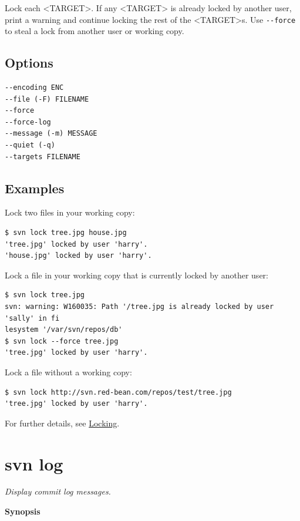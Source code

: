 Lock each \textless TARGET\textgreater. If any
\textless TARGET\textgreater{} is already locked by another user, print
a warning and continue locking the rest of the
\textless TARGET\textgreater s. Use \texttt{-\/-force} to steal a lock
from another user or working copy.

\subsection{Options}

\begin{verbatim}
--encoding ENC
--file (-F) FILENAME
--force
--force-log
--message (-m) MESSAGE
--quiet (-q)
--targets FILENAME
\end{verbatim}

\subsection{Examples}

Lock two files in your working copy:

\begin{verbatim}
$ svn lock tree.jpg house.jpg
'tree.jpg' locked by user 'harry'.
'house.jpg' locked by user 'harry'.
\end{verbatim}

Lock a file in your working copy that is currently locked by another
user:

\begin{verbatim}
$ svn lock tree.jpg
svn: warning: W160035: Path '/tree.jpg is already locked by user 'sally' in fi
lesystem '/var/svn/repos/db'
$ svn lock --force tree.jpg
'tree.jpg' locked by user 'harry'.
\end{verbatim}

Lock a file without a working copy:

\begin{verbatim}
$ svn lock http://svn.red-bean.com/repos/test/tree.jpg
'tree.jpg' locked by user 'harry'.
\end{verbatim}

For further details, see \hyperref[svn.advanced.locking]{Locking}.

\section{svn log}\label{svn.ref.svn.c.log}

\emph{Display commit log messages.}

\textbf{Synopsis}


